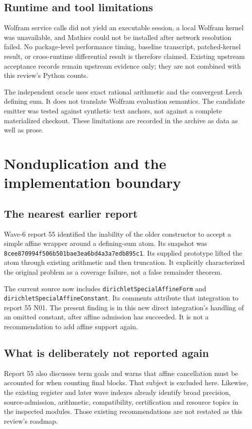 \documentclass[11pt,letterpaper]{article}
\newcommand{\code}[1]{\nolinkurl{#1}}
\begin{document}
\subsection{Runtime and tool limitations}
Wolfram service calls did not yield an executable session, a local Wolfram
kernel was unavailable, and Mathics could not be installed after network
resolution failed. No package-level performance timing, baseline transcript,
patched-kernel result, or cross-runtime differential result is therefore
claimed. Existing upstream acceptance records remain upstream evidence only;
they are not combined with this review's Python counts.

The independent oracle uses exact rational arithmetic and the convergent
Lerch defining sum. It does not translate Wolfram evaluation semantics. The
candidate emitter was tested against synthetic text anchors, not against a
complete materialized checkout. These limitations are recorded in the archive
as data as well as prose.

\section{Nonduplication and the implementation boundary}
\subsection{The nearest earlier report}
Wave-6 report 55 identified the inability of the older constructor to accept a
simple affine wrapper around a defining-sum atom. Its snapshot was
\texttt{8cee870994f506b501bae3ea6bd4a3a7edb895c1}.
Its supplied prototype lifted the atom through existing arithmetic and then
truncation. It explicitly characterized the original problem as a coverage
failure, not a false remainder theorem.\cite{r55}

The current source now includes \code{dirichletSpecialAffineForm} and
\code{dirichletSpecialAffineConstant}. Its comments attribute that integration
to report 55 N01. The present finding is in this new direct integration's
handling of an omitted constant, after affine admission has succeeded. It is
not a recommendation to add affine support again.\cite{dirichlet}

\subsection{What is deliberately not reported again}
Report 55 also discusses term goals and warns that affine cancellation must
be accounted for when counting final blocks. That subject is excluded here.
Likewise, the existing register and later wave indexes already identify broad
precision, source-admission, arithmetic, compatibility, certification and
resource topics in the inspected modules. Those existing recommendations are
not restated as this review's roadmap.\cite{register,wave5,wave6,r55}
\end{document}
